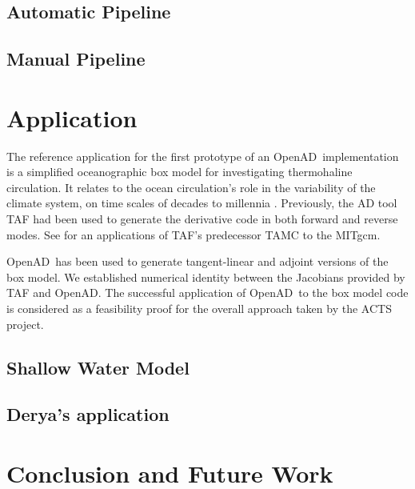 \documentclass[acmtocl,acmnow]{acmtrans2m}
\newcommand{\OpenAD}{OpenAD}
\begin{document}
\subsection{Automatic Pipeline}
\subsection{Manual Pipeline}\label{ssec:manualPipeline}


\section{Application}

The reference application for the first prototype of an \OpenAD\ implementation
is a simplified oceanographic box model for investigating
thermohaline circulation. It relates to the
ocean circulation's role in the variability of the climate system,
on time scales of decades to millennia \cite{tzi-ioa:02}.
Previously, the AD tool TAF \cite{GiKa02} 
had been used to generate the derivative
code in both forward and reverse modes.
See \cite{maro-eta:99} for an applications of
TAF's predecessor TAMC to the MITgcm.

\OpenAD\ has been used to generate tangent-linear and 
adjoint versions of the box model. We established numerical identity between
the Jacobians provided by TAF and \OpenAD.
The successful 
application of \OpenAD\ to the box model code is considered as a feasibility 
proof for the overall approach taken by the ACTS project.  
\subsection{Shallow Water Model}
\subsection{Derya's application}
\section*{Conclusion and Future Work}
\end{document}
